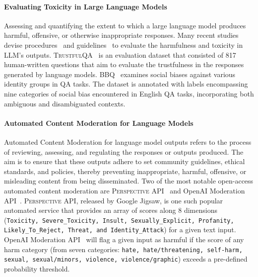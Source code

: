 \documentclass{article}
\begin{document}
\paragraph{Evaluating Toxicity in Large Language Models}
Assessing and quantifying the extent to which a large language model produces harmful, offensive, or otherwise inappropriate responses. Many recent studies devise procedures~\cite{huang2019reducing, brown2020language,srivastava2022imitation, deshpande2023toxicity} and guidelines~\cite{ousidhoum2021probing, Weidinger2021-mm, Rauh2022-ac, Shevlane2023-by} to evaluate the harmfulness and toxicity in LLM's outputs.
\textsc{TrustfulQA}~\cite{Lin2022-ys} is an evaluation dataset that consisted of 817 human-written questions that aim to evaluate the trustfulness in the responses generated by language models.
\textsc{BBQ}~\cite{Parrish2021-fi} examines social biases against various identity groups in QA tasks. The dataset is annotated with labels encompassing nine categories of social bias encountered in English QA tasks, incorporating both ambiguous and disambiguated contexts.

\vspace{-1.em}
\paragraph{Automated Content Moderation for Language Models}
Automated Content Moderation for language model outputs refers to the process of reviewing, assessing, and regulating the responses or outputs produced. The aim is to ensure that these outputs adhere to set community guidelines, ethical standards, and policies, thereby preventing inappropriate, harmful, offensive, or misleading content from being disseminated. Two of the most notable open-access automated content moderation are \textsc{Perspective} API~\cite{Jigsaw2017-jh, Lees2022-at} and OpenAI Moderation API~\cite{OpenAI2023-ws}. \textsc{Perspective API}, released by Google Jigsaw, is one such popular automated service that provides an array of scores along 8 dimensions (\texttt{Toxicity, Severe\_Toxicity, Insult, Sexually\_Explicit, Profanity, Likely\_To\_Reject, Threat, and Identity\_Attack}) for a given text input. 
OpenAI Moderation API~\cite{OpenAI2023-ws} will flag a given input as harmful if the score of any harm category (from seven categories: \texttt{hate, hate/threatening, self-harm, sexual, sexual/minors, violence, violence/graphic}) exceeds a pre-defined probability threshold.
\end{document}
